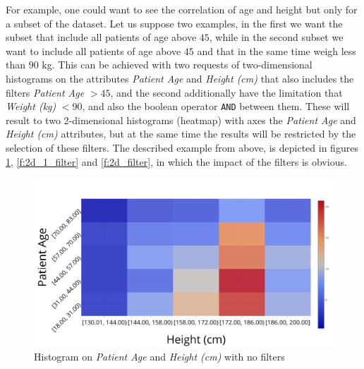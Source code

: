 For example, one could want to see the correlation of age and height but only for a subset of the dataset.
Let us suppose two examples, in the first we want the subset that include all patients of age above $45$, while in the second subset we want to include all patients of age above $45$ and that in the same time weigh less than $90$ kg.
This can be achieved with two requests of two\hyp dimensional histograms on the attributes \textit{Patient Age} and \textit{Height (cm)} that also includes the filters \textit{Patient Age} $ > 45$, and the second additionally have the limitation that \textit{Weight (kg)} $ < 90$, and also the boolean operator \texttt{AND} between them.
These will result to two 2\hyp dimensional histograms (heatmap) with axes the \textit{Patient Age} and \textit{Height (cm)} attributes, but at the same time the results will be restricted by the selection of these filters.
The described example from above, is depicted in figures \ref{f:2d_no_filter}, \ref{f:2d_1_filter} and \ref{f:2d_filter}, in which the impact of the filters is obvious.


\begin{figure}[t]
  \centering
  \includegraphics[width=0.8\linewidth]{figures/2d_no_filter.png}
  \caption{Histogram on \textit{Patient Age} and \textit{Height (cm)} with no filters}
  \label{f:2d_no_filter}
\end{figure}

